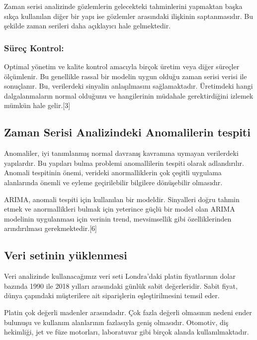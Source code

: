 \documentclass[11pt]{article}
\begin{document}
Zaman serisi analizinde gözlemlerin gelecekteki tahminlerini yapmaktan
başka sıkça kullanılan diğer bir yapı ise gözlemler arasındaki ilişkinin
saptanmasıdır. Bu şekilde zaman serileri daha açıklayıcı hale
gelmektedir.

\subsubsection{Süreç Kontrol:}\label{suxfcreuxe7-kontrol}

Optimal yönetim ve kalite kontrol amacıyla birçok üretim veya diğer
süreçler ölçümlenir. Bu genellikle rassal bir modelin uygun olduğu zaman
serisi verisi ile sonuçlanır. Bu, verilerdeki sinyalin anlaşılmasını
sağlamaktadır. Üretimdeki hangi dalgalanmaların normal olduğunu ve
hangilerinin müdahale gerektirdiğini izlemek mümkün hale gelir.{[}3{]}

\subsection{Zaman Serisi Analizindeki Anomalilerin
tespiti}\label{zaman-serisi-analizindeki-anomalilerin-tespiti}

Anomaliler, iyi tanımlanmış normal davranış kavramına uymayan
verilerdeki yapılardır. Bu yapıları bulma problemi anomallilerin tespiti
olarak adlandırılır. Anomali tespitinin önemi, verideki anormalliklerin
çok çeşitli uygulama alanlarında önemli ve eyleme geçirilebilir
bilgilere dönüşebilir olmasıdır.

ARIMA, anomali tespiti için kullanılan bir modeldir. Sinyalleri doğru
tahmin etmek ve anormallikleri bulmak için yeterince güçlü bir model
olan ARIMA modelinin uygulanması için verinin trend, mevsimsellik gibi
özelliklerinden arındırılması gerekmektedir.{[}6{]}

\subsection{Veri setinin yüklenmesi}\label{veri-setinin-yuxfcklenmesi}

Veri analizinde kullanacağımız veri seti Londra'daki platin fiyatlarının
dolar bazında 1990 ile 2018 yılları arasındaki günlük sabit
değerleridir. Sabit fiyat, dünya çapındaki müşterilere ait siparişlerin
eşleştirilmesini temsil eder.

Platin çok değerli madenler arasındadır. Çok fazla değerli olmasının
nedeni ender bulunuşu ve kullanım alanlarının fazlasıyla geniş
olmasıdır. Otomotiv, diş hekimliği, jet ve füze motorları, laboratuvar
gibi birçok alanda kullanılmaktadır.
\end{document}
